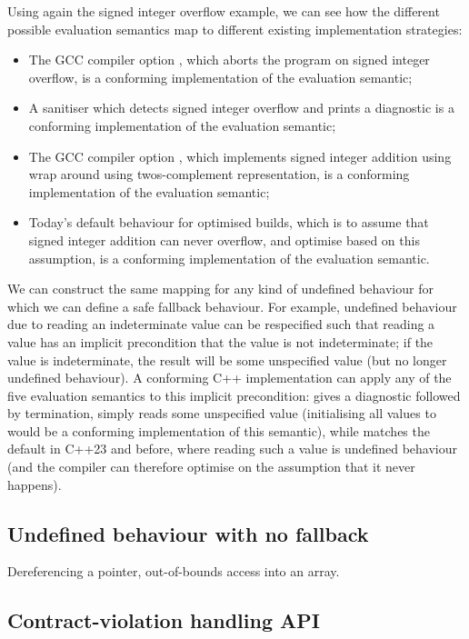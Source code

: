 Using again the signed integer overflow example, we can see how the different possible evaluation semantics map to different existing implementation strategies:
\begin{itemize}
\item The GCC compiler option , which aborts the program on signed integer overflow, is a conforming implementation of the  evaluation semantic;
\item A sanitiser which detects signed integer overflow and prints a diagnostic is a conforming implementation of the  evaluation semantic;
\item The GCC compiler option , which implements signed integer addition using wrap around using twos-complement representation, is a conforming implementation of the  evaluation semantic;
\item Today's default behaviour for optimised builds, which is to assume that signed integer addition can never overflow, and optimise based on this assumption, is a conforming implementation of the  evaluation semantic.
\end{itemize}

We can construct the same mapping for any kind of undefined behaviour for which we can define a safe fallback behaviour. For example, undefined behaviour due to reading an indeterminate value can be respecified such that reading a value has an implicit precondition that the value is not indeterminate; if the value is indeterminate, the result will be some unspecified value (but no longer undefined behaviour). A conforming C++ implementation can apply any of the five evaluation semantics to this implicit precondition:  gives a diagnostic followed by termination,  simply reads some unspecified value (initialising all values to  would be a conforming implementation of this semantic), while  matches the default in C++23 and before, where reading such a value is undefined behaviour (and the compiler can therefore optimise on the assumption that it never happens).


\subsection{Undefined behaviour with no fallback}

Dereferencing a pointer, out-of-bounds access into an array.

\subsection{Contract-violation handling API}

